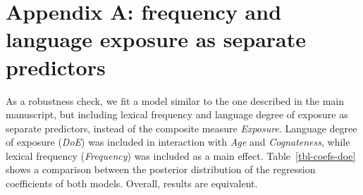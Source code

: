 \documentclass[
]{article}
\author{}
\date{}
\begin{document}
\ifdefined\Shaded\renewenvironment{Shaded}{\begin{tcolorbox}[interior hidden, borderline west={3pt}{0pt}{shadecolor}, frame hidden, sharp corners, breakable, enhanced, boxrule=0pt]}{\end{tcolorbox}}\fi

\hypertarget{appendix-a-frequency-and-language-exposure-as-separate-predictors}{%
\section*{Appendix A: frequency and language exposure as separate
predictors}\label{appendix-a-frequency-and-language-exposure-as-separate-predictors}}

As a robustness check, we fit a model similar to the one described in
the main manuscript, but including lexical frequency and language degree
of exposure as separate predictors, instead of the composite measure
\emph{Exposure}. Language degree of exposure (\emph{DoE}) was included
in interaction with \emph{Age} and \emph{Cognateness}, while lexical
frequency (\emph{Frequency}) was included as a main effect.
Table~\ref{tbl-coefs-doe} shows a comparison between the posterior
distribution of the regression coefficients of both models. Overall,
results are equivalent.
\end{document}
